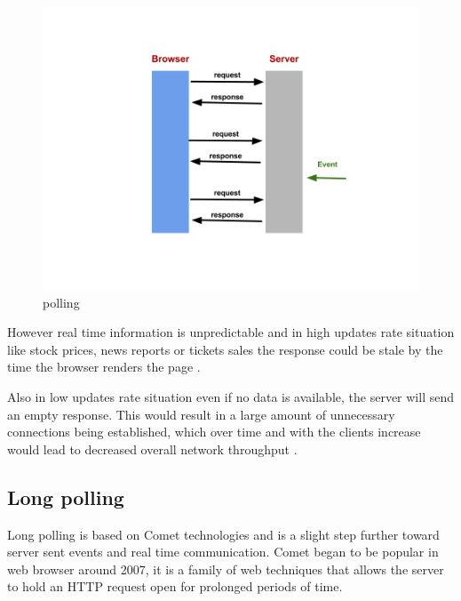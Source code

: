 \begin{figure}[H]
\centering
\includegraphics[width=\textwidth]{./Figures/polling.png}
\caption[Polling]{polling}
\label{fig:polling}
\end{figure}

However real time information is unpredictable and in high updates rate
situation like stock prices, news reports or tickets sales the
response could be stale by the time the browser renders the page
\citep{Reference32}.

Also in low updates rate situation even if no data is available, the server
will send an empty response. This would result in a large amount of unnecessary
connections being established, which over time and with the clients increase
would lead to decreased overall network throughput \citep{Reference2}. 


\subsection{Long polling}

Long polling is based on Comet technologies and is a slight step further toward
server sent events and real time communication. Comet began to be popular in web
browser around 2007, it is a family of web techniques that allows the server to
hold an HTTP request open for prolonged periods of time.

